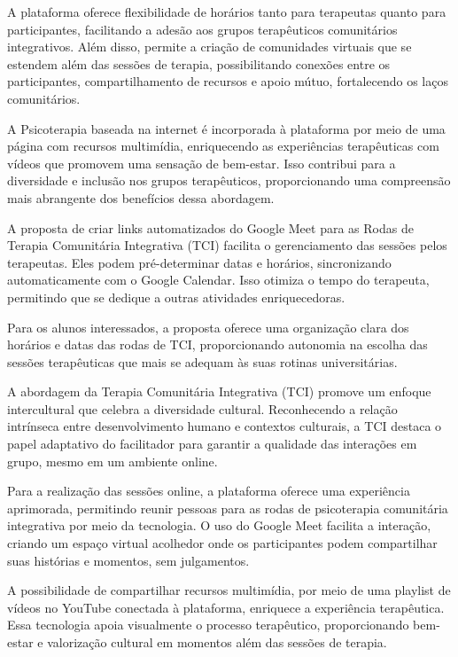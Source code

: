 A plataforma oferece flexibilidade de horários tanto para terapeutas quanto para participantes, facilitando a adesão aos grupos terapêuticos comunitários integrativos. Além disso, permite a criação de comunidades virtuais que se estendem além das sessões de terapia, possibilitando conexões entre os participantes, compartilhamento de recursos e apoio mútuo, fortalecendo os laços comunitários.

A Psicoterapia baseada na internet é incorporada à plataforma por meio de uma página com recursos multimídia, enriquecendo as experiências terapêuticas com vídeos que promovem uma sensação de bem-estar. Isso contribui para a diversidade e inclusão nos grupos terapêuticos, proporcionando uma compreensão mais abrangente dos benefícios dessa abordagem.

A proposta de criar links automatizados do Google Meet para as Rodas de Terapia Comunitária Integrativa (TCI) facilita o gerenciamento das sessões pelos terapeutas. Eles podem pré-determinar datas e horários, sincronizando automaticamente com o Google Calendar. Isso otimiza o tempo do terapeuta, permitindo que se dedique a outras atividades enriquecedoras.

Para os alunos interessados, a proposta oferece uma organização clara dos horários e datas das rodas de TCI, proporcionando autonomia na escolha das sessões terapêuticas que mais se adequam às suas rotinas universitárias.

A abordagem da Terapia Comunitária Integrativa (TCI) promove um enfoque intercultural que celebra a diversidade cultural. Reconhecendo a relação intrínseca entre desenvolvimento humano e contextos culturais, a TCI destaca o papel adaptativo do facilitador para garantir a qualidade das interações em grupo, mesmo em um ambiente online.

Para a realização das sessões online, a plataforma oferece uma experiência aprimorada, permitindo reunir pessoas para as rodas de psicoterapia comunitária integrativa por meio da tecnologia. O uso do Google Meet facilita a interação, criando um espaço virtual acolhedor onde os participantes podem compartilhar suas histórias e momentos, sem julgamentos.

A possibilidade de compartilhar recursos multimídia, por meio de uma playlist de vídeos no YouTube conectada à plataforma, enriquece a experiência terapêutica. Essa tecnologia apoia visualmente o processo terapêutico, proporcionando bem-estar e valorização cultural em momentos além das sessões de terapia.

